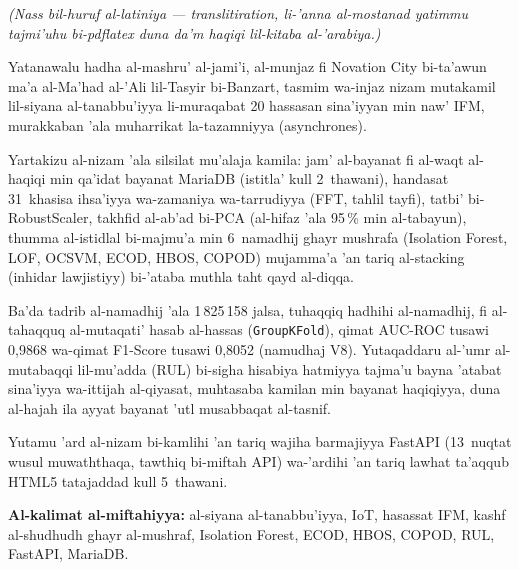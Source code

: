 \documentclass[12pt,a4paper]{report}
\begin{document}
\textit{(Nass bil-huruf al-latiniya — translitiration, li-'anna al-mostanad yatimmu
tajmi'uhu bi-pdflatex duna da'm haqiqi lil-kitaba al-'arabiya.)}

\vspace{0.3cm}

Yatanawalu hadha al-mashru' al-jami'i, al-munjaz fi Novation City bi-ta'awun ma'a
al-Ma'had al-'Ali lil-Tasyir bi-Banzart, tasmim wa-injaz nizam mutakamil lil-siyana
al-tanabbu'iyya li-muraqabat 20 hassasan sina'iyyan min naw' IFM, murakkaban 'ala
muharrikat la-tazamniyya (asynchrones).

Yartakizu al-nizam 'ala silsilat mu'alaja kamila: jam' al-bayanat fi al-waqt al-haqiqi
min qa'idat bayanat MariaDB (istitla' kull 2~thawani), handasat 31~khasisa
ihsa'iyya wa-zamaniya wa-tarrudiyya (FFT, tahlil tayfi), tatbi' bi-RobustScaler,
takhfid al-ab'ad bi-PCA (al-hifaz 'ala 95\,\% min al-tabayun), thumma al-istidlal
bi-majmu'a min 6~namadhij ghayr mushrafa (Isolation Forest, LOF, OCSVM, ECOD, HBOS,
COPOD) mujamma'a 'an tariq al-stacking (inhidar lawjistiyy) bi-'ataba muthla taht
qayd al-diqqa.

Ba'da tadrib al-namadhij 'ala 1\,825\,158 jalsa, tuhaqqiq hadhihi al-namadhij, fi
al-tahaqquq al-mutaqati' hasab al-hassas (\texttt{GroupKFold}), qimat AUC-ROC tusawi
0,9868 wa-qimat F1-Score tusawi 0,8052 (namudhaj V8). Yutaqaddaru al-'umr al-mutabaqqi
lil-mu'adda (RUL) bi-sigha hisabiya hatmiyya tajma'u bayna 'atabat sina'iyya
wa-ittijah al-qiyasat, muhtasaba kamilan min bayanat haqiqiyya, duna al-hajah ila
ayyat bayanat 'utl musabbaqat al-tasnif.

Yutamu 'ard al-nizam bi-kamlihi 'an tariq wajiha barmajiyya FastAPI (13~nuqtat
wusul muwaththaqa, tawthiq bi-miftah API) wa-'ardihi 'an tariq lawhat ta'aqqub
HTML5 tatajaddad kull 5~thawani.

\vspace{0.5cm}
\noindent\textbf{Al-kalimat al-miftahiyya:} al-siyana al-tanabbu'iyya, IoT, hasassat
IFM, kashf al-shudhudh ghayr al-mushraf, Isolation Forest, ECOD, HBOS, COPOD, RUL,
FastAPI, MariaDB.

\end{document}
